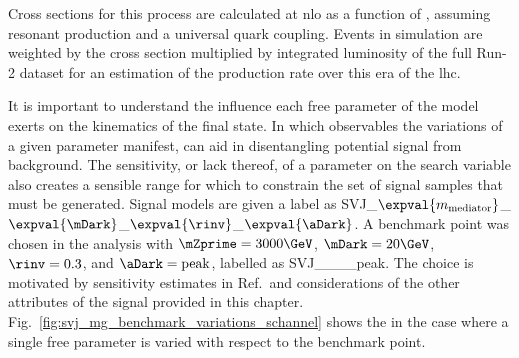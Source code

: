 Cross sections for this process are calculated at \acrshort{nlo} as a function of \mZprime, assuming resonant production and a universal quark coupling. Events in simulation are weighted by the cross section multiplied by integrated luminosity of the full Run-2 dataset for an estimation of the production rate over this era of the \acrshort{lhc}. %

It is important to understand the influence each free parameter of the model exerts on the kinematics of the final state. In which observables the variations of a given parameter manifest, can aid in disentangling potential signal from background. The sensitivity, or lack thereof, of a parameter on the search variable also creates a sensible range for which to constrain the set of signal samples that must be generated. Signal models are given a label as SVJ\_\-$\expval{m_{\mathrm{mediator}}}$\_\-$\expval{\mDark}$\_\-$\expval{\rinv}$\_\-$\expval{\aDark}$. A benchmark point was chosen in the analysis with $\mZprime = \text{3000}\GeV$, $\mDark = \text{20}\GeV$, $\rinv = \text{0.3}$, and $\aDark = \text{peak}$, labelled as SVJ\_\_\_\_\-peak. The choice is motivated by sensitivity estimates in Ref.~and considerations of the other attributes of the signal provided in this chapter. Fig.~\ref{fig:svj_mg_benchmark_variations_schannel} shows the \mT in the case where a single free parameter is varied with respect to the benchmark point.

